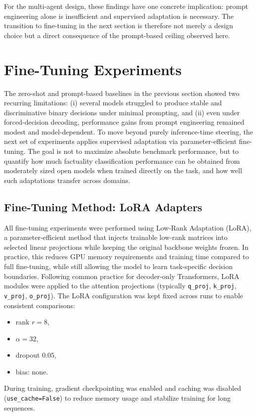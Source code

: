 For the multi-agent design, these findings have one concrete implication: prompt engineering alone is insufficient and supervised adaptation is necessary. The transition to fine-tuning in the next section is therefore not merely a design choice but 
a direct consequence of the prompt-based ceiling observed here.

\section{Fine-Tuning Experiments}
\label{sec:finetuning}

The zero-shot and prompt-based baselines in the previous section showed two recurring limitations: (i) several models struggled to produce stable and discriminative binary decisions under minimal prompting, and (ii) even under forced-decision decoding, performance gains from prompt engineering remained modest and model-dependent. To move beyond purely inference-time steering, the next set of experiments applies supervised adaptation via parameter-efficient fine-tuning. The goal is not to maximize absolute benchmark performance, but to quantify how much factuality classification performance can be obtained from moderately sized open models when trained directly on the task, and how well such adaptations transfer across domains.

\subsection{Fine-Tuning Method: LoRA Adapters}

All fine-tuning experiments were performed using Low-Rank Adaptation (LoRA), a parameter-efficient method that injects trainable low-rank matrices into selected linear projections while keeping the original backbone weights frozen. In practice, this reduces GPU memory requirements and training time compared to full fine-tuning, while still allowing the model to learn task-specific decision boundaries. Following common practice for decoder-only Transformers, LoRA modules were applied to the attention projections (typically \texttt{q\_proj}, \texttt{k\_proj}, \texttt{v\_proj}, \texttt{o\_proj}). The LoRA configuration was kept fixed across runs to enable consistent comparisons:
\begin{itemize}
    \item rank $r=8$,
    \item $\alpha=32$,
    \item dropout $0.05$,
    \item bias: none.
\end{itemize}
During training, gradient checkpointing was enabled and caching was disabled (\texttt{use\_cache=False}) to reduce memory usage and stabilize training for long sequences.

